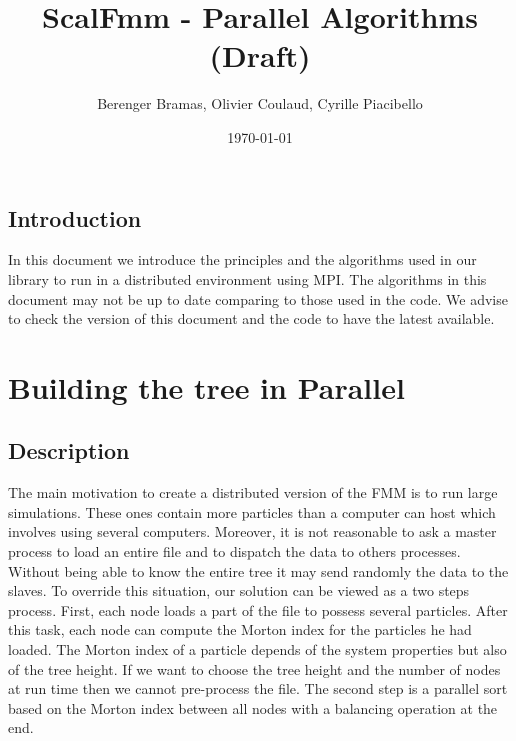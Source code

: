 \documentclass[12pt,letterpaper,titlepage]{report}
\author{Berenger Bramas, Olivier Coulaud, Cyrille Piacibello}
\title{ScalFmm - Parallel Algorithms (Draft)}
\date{\today}
\begin{document}
\maketitle{}
\newpage
\tableofcontents
\newpage
\section{Introduction}
In this document we introduce the principles and the algorithms used
in our library to run in a distributed environment using MPI.  The
algorithms in this document may not be up to date comparing to those
used in the code.  We advise to check the version of this document and
the code to have the latest available.
\chapter{Building the tree in Parallel}
\section{Description}
The main motivation to create a distributed version of the FMM is to
run large simulations.  These ones contain more particles than a
computer can host which involves using several computers.  Moreover,
it is not reasonable to ask a master process to load an entire file
and to dispatch the data to others processes. Without being able to
know the entire tree it may send randomly the data to the slaves.  To
override this situation, our solution can be viewed as a two steps
process.  First, each node loads a part of the file to possess several
particles.  After this task, each node can compute the Morton index
for the particles he had loaded.  The Morton index of a particle
depends of the system properties but also of the tree height.  If we
want to choose the tree height and the number of nodes at run time
then we cannot pre-process the file.  The second step is a parallel
sort based on the Morton index between all nodes with a balancing
operation at the end.
\end{document}
